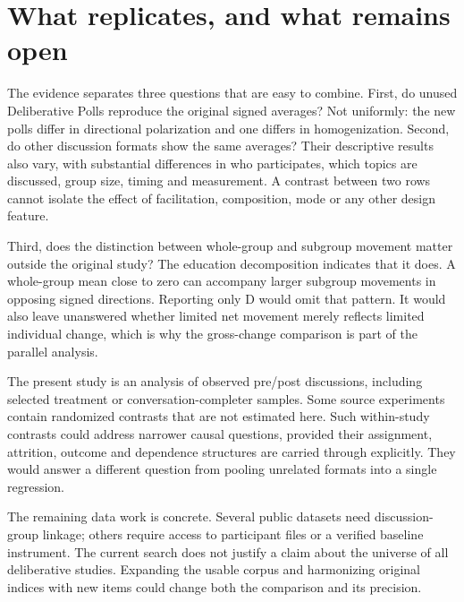 \documentclass[11pt]{article}
\begin{document}
\section{What replicates, and what remains open}
The evidence separates three questions that are easy to combine. First, do unused
Deliberative Polls reproduce the original signed averages? Not uniformly: the new
polls differ in directional polarization and one differs in homogenization.
Second, do other discussion formats show the same averages? Their descriptive
results also vary, with substantial differences in who participates, which topics
are discussed, group size, timing and measurement. A contrast between two rows
cannot isolate the effect of facilitation, composition, mode or any other design feature.

Third, does the distinction between whole-group and subgroup movement matter
outside the original study? The education decomposition indicates that it does.
A whole-group mean close to zero can accompany larger subgroup movements in opposing
signed directions. Reporting only D would omit that pattern. It would also leave
unanswered whether limited net movement merely reflects limited individual change,
which is why the gross-change comparison is part of the parallel analysis.

The present study is an analysis of observed pre/post discussions, including
selected treatment or conversation-completer samples. Some source experiments
contain randomized contrasts that are not estimated here. Such within-study
contrasts could address narrower causal questions, provided their assignment,
attrition, outcome and dependence structures are carried through explicitly.
They would answer a different question from pooling unrelated formats into a
single regression.

The remaining data work is concrete. Several public datasets need discussion-group
linkage; others require access to participant files or a verified baseline
instrument. The current search does not justify a claim about the universe of
all deliberative studies. Expanding the usable corpus and harmonizing original
indices with new items could change both the comparison and its precision.

\clearpage



\clearpage\appendix
\end{document}
